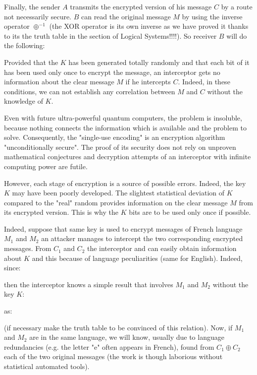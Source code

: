 	Finally, the sender $A$ transmits the encrypted version of his message $C$ by a route not necessarily secure. $B$ can read the original message $M$ by using the inverse operator $\oplus^{-1}$ (the XOR operator is its own inverse as we have proved it thanks to its the truth table in the section of Logical Systems!!!!). So receiver $B$ will do the following:
	
	Provided that the $K$ has been generated totally randomly and that each bit of it has been used only once to encrypt the message, an interceptor gets no information about the clear message $M$ if he intercepts $C$. Indeed, in these conditions, we can not establish any correlation between $M$ and $C$ without the knowledge of $K$.
	
	Even with future ultra-powerful quantum computers, the problem is insoluble, because nothing connects the information which is available and the problem to solve. Consequently, the "single-use encoding" is an encryption algorithm "unconditionally secure". The proof of its security does not rely on unproven mathematical conjectures and decryption attempts of an interceptor with infinite computing power are futile.
	
	However, each stage of encryption is a source of possible errors. Indeed, the key $K$ may have been poorly developed. The slightest statistical deviation of $K$ compared to the "real" random provides information on the clear message $M$ from its encrypted version. This is why the $K$ bits are to be used only once if possible.
	
	Indeed, suppose that same key is used to encrypt messages of French language $M_1$ and $M_2$ an attacker manages to intercept the two corresponding encrypted messages. From $C_1$ and $C_2$ the interceptor and can easily obtain information about $K$ and this because of language peculiarities (same for English). Indeed, since:
	
	then the interceptor knows a simple result that involves $M_1$ and $M_2$ without the key $K$:
	
	as:
	
	(if necessary make the truth table to be convinced of this relation). Now, if $M_1$ and $M_2$ are in the same language, we will know, usually due to language redundancies (e.g. the letter "e" often appears in French), found from $C_1\oplus C_2$ each of the two original messages (the work is though laborious without statistical automated tools).
	
